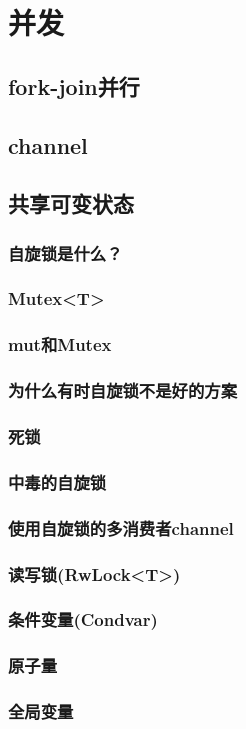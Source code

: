 \chapter{并发}\label{ch19}

\section{fork-join并行}

\section{channel}

\section{共享可变状态}

\subsection{自旋锁是什么？}

\subsection{Mutex<T>}

\subsection{mut和Mutex}

\subsection{为什么有时自旋锁不是好的方案}

\subsection{死锁}

\subsection{中毒的自旋锁}

\subsection{使用自旋锁的多消费者channel}

\subsection{读写锁(RwLock<T>)}

\subsection{条件变量(Condvar)}

\subsection{原子量}

\subsection{全局变量}\label{globalvar}